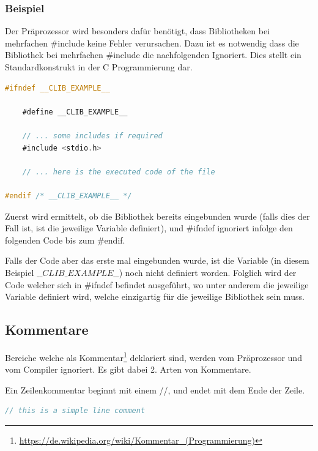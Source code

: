 \subsubsection{Beispiel}

Der Pr\"aprozessor wird besonders daf\"ur ben\"otigt, dass Bibliotheken bei mehrfachen \#include keine Fehler verursachen. Dazu ist es notwendig dass die Bibliothek bei mehrfachen \#include die nachfolgenden Ignoriert. Dies stellt ein Standardkonstrukt in der C Programmierung dar.

\begin{lstlisting}[language=C]
#ifndef __CLIB_EXAMPLE__

	#define __CLIB_EXAMPLE__
	
	// ... some includes if required
	#include <stdio.h>

	// ... here is the executed code of the file

#endif /* __CLIB_EXAMPLE__ */
\end{lstlisting}

Zuerst wird ermittelt, ob die Bibliothek bereits eingebunden wurde (falls dies der Fall ist, ist die jeweilige Variable definiert), und \#ifndef ignoriert infolge den folgenden Code bis zum \#endif.

Falls der Code aber das erste mal eingebunden wurde, ist die Variable (in diesem Beispiel $\_\_CLIB\_EXAMPLE\_\_$) noch nicht definiert worden. Folglich wird der Code welcher sich in \#ifndef befindet ausgef\"uhrt, wo unter anderem die jeweilige Variable definiert wird, welche einzigartig f\"ur die jeweilige Bibliothek sein muss.

\subsection{Kommentare}

Bereiche welche als Kommentar\footnote{\url{https://de.wikipedia.org/wiki/Kommentar_(Programmierung)}} deklariert sind, werden vom Pr\"aprozessor und vom Compiler ignoriert. Es gibt dabei 2. Arten von Kommentare.


Ein Zeilenkommentar beginnt mit einem //, und endet mit dem Ende der Zeile.

\begin{lstlisting}[language=C]
// this is a simple line comment
\end{lstlisting}


